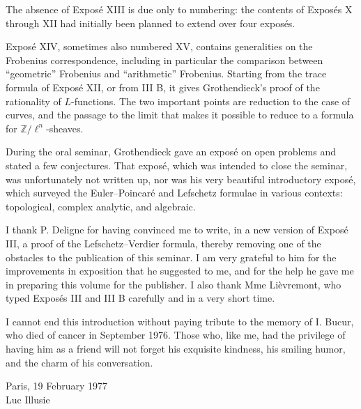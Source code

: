 \documentclass[11pt]{article}
\newcommand{\Z}{\mathbb{Z}}
\begin{document}
The absence of Exposé XIII is due only to numbering: the contents of Exposés X through XII had initially been planned to extend over four exposés.

Exposé XIV, sometimes also numbered XV, contains generalities on the Frobenius correspondence, including in particular the comparison between ``geometric'' Frobenius and ``arithmetic'' Frobenius. Starting from the trace formula of Exposé XII, or from III B, it gives Grothendieck's proof of the rationality of $L$-functions. The two important points are reduction to the case of curves, and the passage to the limit that makes it possible to reduce to a formula for $\Z/\ell^n$-sheaves.

During the oral seminar, Grothendieck gave an exposé on open problems and stated a few conjectures. That exposé, which was intended to close the seminar, was unfortunately not written up, nor was his very beautiful introductory exposé, which surveyed the Euler--Poincaré and Lefschetz formulae in various contexts: topological, complex analytic, and algebraic.

I thank P. Deligne for having convinced me to write, in a new version of Exposé III, a proof of the Lefschetz--Verdier formula, thereby removing one of the obstacles to the publication of this seminar. I am very grateful to him for the improvements in exposition that he suggested to me, and for the help he gave me in preparing this volume for the publisher. I also thank Mme Lièvremont, who typed Exposés III and III B carefully and in a very short time.

I cannot end this introduction without paying tribute to the memory of I. Bucur, who died of cancer in September 1976. Those who, like me, had the privilege of having him as a friend will not forget his exquisite kindness, his smiling humor, and the charm of his conversation.

\begin{flushright}
Paris, 19 February 1977\\
Luc Illusie
\end{flushright}

\bigskip
\end{document}
